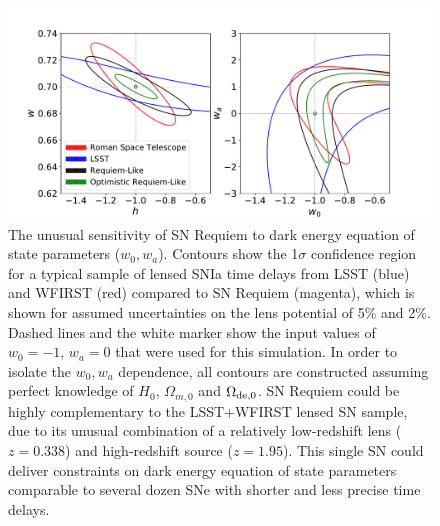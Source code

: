 \documentclass[12pt,dvipsnames]{article}
\begin{document}
\clearpage
\begin{figure}
    \centering
    \includegraphics[width=\textwidth]{../Figures/snrequiem_hw_w0wa_apples_to_lsst_ngrst.pdf}
    \caption{ The unusual sensitivity of SN Requiem to dark energy equation of state parameters ($w_0, w_a$). Contours show the 1$\sigma$ confidence region for a typical sample of lensed SNIa time delays from LSST (blue) and WFIRST (red) compared to SN Requiem (magenta), which is shown for assumed uncertainties on the lens potential of 5\% and 2\%. Dashed lines and the white marker show the input values of $w_0=-1$, $w_a=0$ that were used for this simulation. In order to isolate the $w_0, w_a$ dependence, all contours are constructed assuming perfect knowledge of $H_0$, $\Omega_{m,0}$ and $\Omega_{\rm de,0}$.  SN Requiem could be highly complementary to the LSST+WFIRST lensed SN sample, due to its unusual combination of a relatively low-redshift lens ($z=0.338$) and high-redshift source ($z=1.95$). This single SN could deliver constraints on dark energy equation of state parameters comparable to several dozen SNe with shorter and less precise  time delays.}
    \label{fig:cosmo}
\end{figure}

\clearpage
\end{document}
